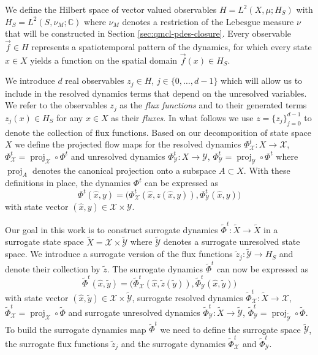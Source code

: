 \documentclass[letterpaper,10pt,3p,preprint]{elsarticle}
\newcommand{\Cbb}{\mathbb{C}}
\newcommand{\Xcal}{\mathcal{X}}
\newcommand{\Ycal}{\mathcal{Y}}
\DeclareMathOperator{\proj}{proj}
\begin{document}
We define the Hilbert space of vector valued observables
$H=L^2(X,\mu;H_S)$ with $H_S=L^2(S,\nu_M;\Cbb)$
where $\nu_M$ denotes a restriction of the Lebesgue
measure $\nu$ that will be constructed in Section
\ref{sec:qmcl-pdes-closure}.
Every observable $\vec{f}\in H$ represents a
spatiotemporal pattern of the dynamics, for which every state
$x\in X$ yields a function on the spatial domain
$\vec{f}(x)\in H_S$.

We introduce $d$ real observables
$z_j\in H$, $j\in\{0,\ldots,d-1\}$
which will allow us to include in the resolved dynamics
terms that depend on the unresolved variables.
We refer to the observables $z_j$ as the \emph{flux functions}
and to their generated terms $z_j(x)\in H_S$
for any $x\in X$ as their \emph{fluxes}.
In what follows we use $z=\{z_j\}_{j=0}^{d-1}$
to denote the collection of flux functions.
Based on our decomposition of state space $X$
we define the projected flow maps for the resolved dynamics
$\Phi_\Xcal^t\colon X\to\Xcal$,
$\Phi_\Xcal^t=\proj_\Xcal\circ\Phi^t$
and unresolved dynamics
$\Phi_\Ycal^t\colon X\to\Ycal$,
$\Phi_\Ycal^t=\proj_\Ycal\circ\Phi^t$
where $\proj_A$ denotes the canonical projection onto
a subspace $A\subset X$.
With these definitions in place, the dynamics $\Phi^t$ can
be expressed as
\begin{equation*}
    \Phi^t(\hat{x},y)=\bigl(\Phi^t_\Xcal(\hat{x},z(\hat{x},y)),
        \Phi_\Ycal^t(\hat{x},y)\bigr)
\end{equation*}
with state vector $(\hat{x},y)\in\Xcal\times\Ycal$.

Our goal in this work is to construct surrogate dynamics
$\tilde{\Phi}^t\colon\tilde{X}\rightarrow\tilde{X}$
in a surrogate state space
$\tilde{X}=\Xcal\times\tilde{\Ycal}$
where $\tilde{\Ycal}$ denotes a surrogate unresolved state space.
We introduce a surrogate version of the flux functions
$\tilde{z}_j\colon\tilde{\Ycal}\to H_S$
and denote their collection by $\tilde{z}$.
The surrogate dynamics $\tilde{\Phi}^t$ can now be
expressed as
\begin{equation}\label{eq:surr-dyn-decomposition}
    \tilde{\Phi}^t(\hat{x},\tilde{y})=
        \bigl(\tilde{\Phi}_\Xcal^t(\hat{x},\tilde{z}(\tilde{y})),
        \tilde{\Phi}_\Ycal^t(\hat{x},\tilde{y})\bigr)
\end{equation}
with state vector
$(\hat{x},\tilde{y})\in\Xcal\times\tilde{\Ycal}$,
surrogate resolved dynamics
$\tilde{\Phi}_\Xcal^t\colon\tilde{X}\to\Xcal$,
$\tilde{\Phi}_\Xcal^t=\proj_\Xcal\circ\tilde{\Phi}$
and surrogate unresolved dynamics
$\tilde{\Phi}_\Ycal^t\colon\tilde{X}\to\tilde{\Ycal}$,
$\tilde{\Phi}_\Ycal^t=\proj_{\tilde{\Ycal}}\circ\tilde{\Phi}$.
To build the surrogate dynamics map $\tilde{\Phi}^t$ we need to
define the surrogate space $\tilde{\Ycal}$,
the surrogate flux functions $\tilde{z}_j$
and the surrogate dynamics
$\tilde{\Phi}_\Xcal^t$ and $\tilde{\Phi}_\Ycal^t$.
\end{document}
